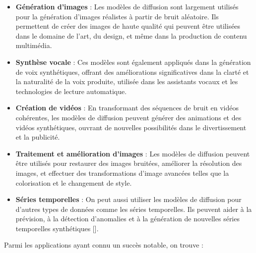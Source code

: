 \begin{itemize}
	\item \textbf{Génération d'images} : Les modèles de diffusion sont largement utilisés pour la génération d'images réalistes à partir de bruit aléatoire. Ils permettent de créer des images de haute qualité qui peuvent être utilisées dans le domaine de l'art, du design, et même dans la production de contenu multimédia.

	\item \textbf{Synthèse vocale} : Ces modèles sont également appliqués dans la génération de voix synthétiques, offrant des améliorations significatives dans la clarté et la naturalité de la voix produite, utilisée dans les assistants vocaux et les technologies de lecture automatique.

	\item \textbf{Création de vidéos} : En transformant des séquences de bruit en vidéos cohérentes, les modèles de diffusion peuvent générer des animations et des vidéos synthétiques, ouvrant de nouvelles possibilités dans le divertissement et la publicité.

	\item \textbf{Traitement et amélioration d'images} : Les modèles de diffusion peuvent être utilisés pour restaurer des images bruitées, améliorer la résolution des images, et effectuer des transformations d'image avancées telles que la colorisation et le changement de style.

	\item \textbf{Séries temporelles} : On peut aussi utiliser les modèles de diffusion pour d'autres types de données comme les séries temporelles. Ils peuvent aider à la prévision, à la détection d'anomalies et à la génération de nouvelles séries temporelles synthétiques [\cite{yang2023survey}].
\end{itemize}

Parmi les applications ayant connu un succès notable, on trouve :

